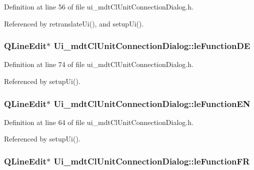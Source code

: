Definition at line 56 of file ui\-\_\-mdt\-Cl\-Unit\-Connection\-Dialog.\-h.



Referenced by retranslate\-Ui(), and setup\-Ui().

\hypertarget{class_ui__mdt_cl_unit_connection_dialog_aeebab0edf9398a481f9c3b0848b21c69}{
\subsubsection[{le\-Function\-D\-E}]{\setlength{\rightskip}{0pt plus 5cm}Q\-Line\-Edit$\ast$ Ui\-\_\-mdt\-Cl\-Unit\-Connection\-Dialog\-::le\-Function\-D\-E}}\label{class_ui__mdt_cl_unit_connection_dialog_aeebab0edf9398a481f9c3b0848b21c69}


Definition at line 74 of file ui\-\_\-mdt\-Cl\-Unit\-Connection\-Dialog.\-h.



Referenced by setup\-Ui().

\hypertarget{class_ui__mdt_cl_unit_connection_dialog_a550a9bd42dc46cbea3060bffc10f7f31}{
\subsubsection[{le\-Function\-E\-N}]{\setlength{\rightskip}{0pt plus 5cm}Q\-Line\-Edit$\ast$ Ui\-\_\-mdt\-Cl\-Unit\-Connection\-Dialog\-::le\-Function\-E\-N}}\label{class_ui__mdt_cl_unit_connection_dialog_a550a9bd42dc46cbea3060bffc10f7f31}


Definition at line 64 of file ui\-\_\-mdt\-Cl\-Unit\-Connection\-Dialog.\-h.



Referenced by setup\-Ui().

\hypertarget{class_ui__mdt_cl_unit_connection_dialog_addb279de949cd36d065256cbae866fdd}{
\subsubsection[{le\-Function\-F\-R}]{\setlength{\rightskip}{0pt plus 5cm}Q\-Line\-Edit$\ast$ Ui\-\_\-mdt\-Cl\-Unit\-Connection\-Dialog\-::le\-Function\-F\-R}}\label{class_ui__mdt_cl_unit_connection_dialog_addb279de949cd36d065256cbae866fdd}


